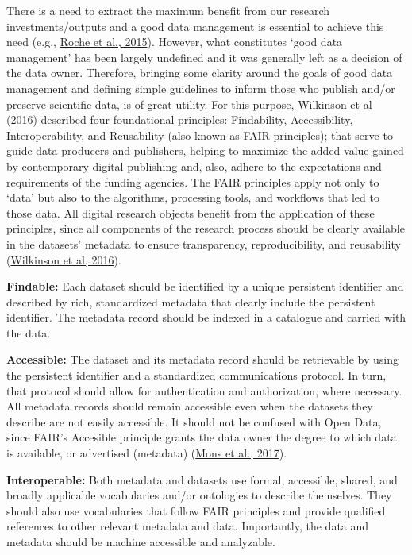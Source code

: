 \documentclass[
]{book}
\begin{document}
There is a need to extract the maximum benefit from our research investments/outputs and a good data management is essential to achieve this need (e.g., \href{https://doi.org/10.1371/journal.pbio.1002295}{Roche et al., 2015}). However, what constitutes `good data management' has been largely undefined and it was generally left as a decision of the data owner. Therefore, bringing some clarity around the goals of good data management and defining simple guidelines to inform those who publish and/or preserve scientific data, is of great utility. For this purpose, \href{https://www.nature.com/articles/sdata201618}{Wilkinson et al (2016)} described four foundational principles: Findability, Accessibility, Interoperability, and Reusability (also known as FAIR principles); that serve to guide data producers and publishers, helping to maximize the added value gained by contemporary digital publishing and, also, adhere to the expectations and requirements of the funding agencies. The FAIR principles apply not only to `data' but also to the algorithms, processing tools, and workflows that led to those data. All digital research objects benefit from the application of these principles, since all components of the research process should be clearly available in the datasets' metadata to ensure transparency, reproducibility, and reusability (\href{https://www.nature.com/articles/sdata201618}{Wilkinson et al, 2016}).

\textbf{Findable:} Each dataset should be identified by a unique persistent identifier and described by rich, standardized metadata that clearly include the persistent identifier. The metadata record should be indexed in a catalogue and carried with the data.

\textbf{Accessible:} The dataset and its metadata record should be retrievable by using the persistent identifier and a standardized communications protocol. In turn, that protocol should allow for authentication and authorization, where necessary. All metadata records should remain accessible even when the datasets they describe are not easily accessible. It should not be confused with Open Data, since FAIR's Accesible principle grants the data owner the degree to which data is available, or advertised (metadata) (\href{https://doi.org/10.3233/ISU-170824}{Mons et al., 2017}).

\textbf{Interoperable:} Both metadata and datasets use formal, accessible, shared, and broadly applicable vocabularies and/or ontologies to describe themselves. They should also use vocabularies that follow FAIR principles and provide qualified references to other relevant metadata and data. Importantly, the data and metadata should be machine accessible and analyzable.
\end{document}
